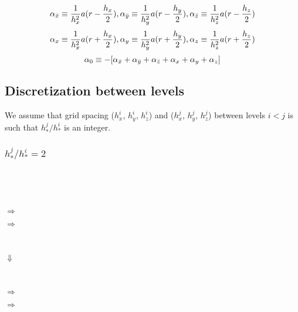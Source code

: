 \documentclass[10pt]{article}
\begin{document}
\[\alpha_{\bar{x}}  \equiv  \frac{1}{h_x^2} a(r-\frac{h_x}{2}),
 \alpha_{\bar{y}}  \equiv  \frac{1}{h_y^2} a(r-\frac{h_y}{2}), 
 \alpha_{\bar{z}}  \equiv  \frac{1}{h_z^2} a(r-\frac{h_z}{2}) \]
 \[\alpha_{x}  \equiv  \frac{1}{h_x^2} a(r+\frac{h_x}{2}), 
 \alpha_{y}  \equiv  \frac{1}{h_y^2} a(r+\frac{h_y}{2}),
 \alpha_{z}  \equiv  \frac{1}{h_z^2} a(r+\frac{h_z}{2}) \]
 \[\alpha_{0}   \equiv  - [\alpha_{\bar{x}} + \alpha_{\bar{y}} + \alpha_{\bar{z}} + \alpha_{x} + \alpha_{y} + \alpha_{z}] \]

\subsection{Discretization between levels}

We assume that grid spacing ($h^i_x$, $h^i_y$, $h^i_z$) and 
($h^j_x$, $h^j_y$, $h^j_z$) between levels $i < j$ is such that
$h^j_* / h^i_*$ is an integer.


\subsubsection{$h^j_* / h^i_* = 2$}


\begin{center}
\begin{minipage}{1.25in}
\end{minipage} \ \ \ 
\begin{minipage}{1.25in}
\end{minipage} \ \ \ 
\begin{minipage}{1.25in}
\end{minipage}
\end{center}



\begin{center}
\begin{minipage}{2in}
\end{minipage}$\Rightarrow$
\begin{minipage}{2in}
\end{minipage}$\Rightarrow$
\begin{minipage}{2in}
\end{minipage} \\
\begin{minipage}{4.5in}
\hfill $\Downarrow$
\end{minipage} \\
\begin{minipage}{2in}
\end{minipage}$\Rightarrow$
\begin{minipage}{2in}
\end{minipage}$\Rightarrow$
\begin{minipage}{2in}
\end{minipage}
\end{center}
\end{document}
